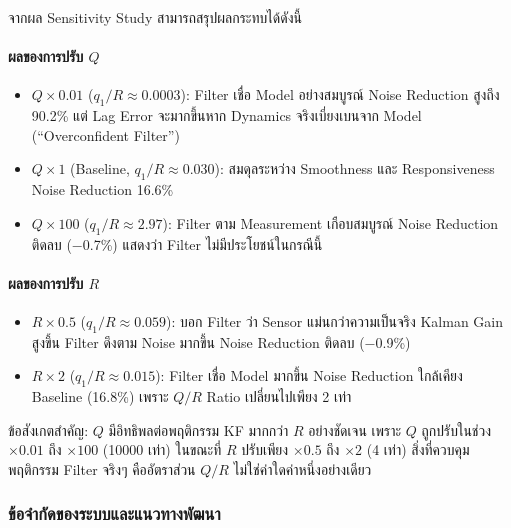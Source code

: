 จากผล Sensitivity Study สามารถสรุปผลกระทบได้ดังนี้

\paragraph{ผลของการปรับ $Q$}
\begin{itemize}
    \item $Q \times 0.01$ ($q_1/R \approx 0.0003$): Filter เชื่อ Model อย่างสมบูรณ์
          Noise Reduction สูงถึง 90.2\% แต่ Lag Error จะมากขึ้นหาก
          Dynamics จริงเบี่ยงเบนจาก Model (``Overconfident Filter'')
    \item $Q \times 1$ (Baseline, $q_1/R \approx 0.030$): สมดุลระหว่าง
          Smoothness และ Responsiveness Noise Reduction 16.6\%
    \item $Q \times 100$ ($q_1/R \approx 2.97$): Filter ตาม Measurement
          เกือบสมบูรณ์ Noise Reduction ติดลบ ($-$0.7\%)
          แสดงว่า Filter ไม่มีประโยชน์ในกรณีนี้
\end{itemize}

\paragraph{ผลของการปรับ $R$}
\begin{itemize}
    \item $R \times 0.5$ ($q_1/R \approx 0.059$): บอก Filter ว่า Sensor
          แม่นกว่าความเป็นจริง Kalman Gain สูงขึ้น Filter ดึงตาม Noise
          มากขึ้น Noise Reduction ติดลบ ($-$0.9\%)
    \item $R \times 2$ ($q_1/R \approx 0.015$): Filter เชื่อ Model มากขึ้น
          Noise Reduction ใกล้เคียง Baseline (16.8\%)
          เพราะ $Q/R$ Ratio เปลี่ยนไปเพียง 2 เท่า
\end{itemize}

ข้อสังเกตสำคัญ: $Q$ มีอิทธิพลต่อพฤติกรรม KF มากกว่า $R$ อย่างชัดเจน
เพราะ $Q$ ถูกปรับในช่วง $\times 0.01$ ถึง $\times 100$ (10000 เท่า)
ในขณะที่ $R$ ปรับเพียง $\times 0.5$ ถึง $\times 2$ (4 เท่า)
สิ่งที่ควบคุมพฤติกรรม Filter จริงๆ คืออัตราส่วน $Q/R$
ไม่ใช่ค่าใดค่าหนึ่งอย่างเดียว

\subsubsection{ข้อจำกัดของระบบและแนวทางพัฒนา}

